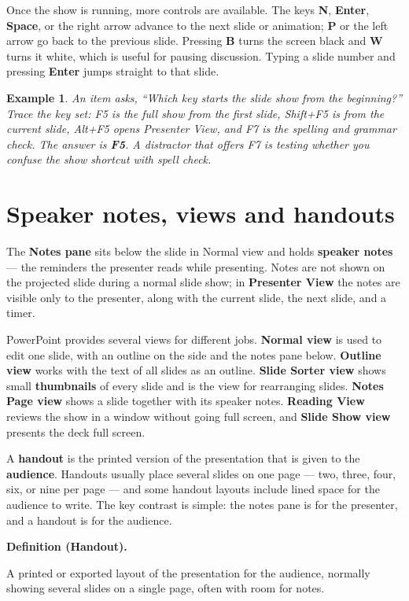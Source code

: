 \documentclass[11pt]{article}
\newtheorem{example}{Example}[section]
\newenvironment{definitionbox}[1]{%
  \par\noindent\textbf{Definition (#1).}\ \itshape
}{\par\vspace{0.3em}}
\begin{document}
Once the show is running, more controls are available. The keys \textbf{N},
\textbf{Enter}, \textbf{Space}, or the right arrow advance to the next slide or
animation; \textbf{P} or the left arrow go back to the previous slide.
Pressing \textbf{B} turns the screen black and \textbf{W} turns it white, which
is useful for pausing discussion. Typing a slide number and pressing
\textbf{Enter} jumps straight to that slide.

\begin{example}
An item asks, ``Which key starts the slide show from the beginning?'' Trace
the key set: F5 is the full show from the first slide, Shift+F5 is from the
current slide, Alt+F5 opens Presenter View, and F7 is the spelling and grammar
check. The answer is \textbf{F5}. A distractor that offers F7 is testing
whether you confuse the show shortcut with spell check.
\end{example}

\section{Speaker notes, views and handouts}
The \textbf{Notes pane} sits below the slide in Normal view and holds
\textbf{speaker notes} --- the reminders the presenter reads while presenting.
Notes are not shown on the projected slide during a normal slide show; in
\textbf{Presenter View} the notes are visible only to the presenter, along with
the current slide, the next slide, and a timer.

PowerPoint provides several views for different jobs. \textbf{Normal view} is
used to edit one slide, with an outline on the side and the notes pane below.
\textbf{Outline view} works with the text of all slides as an outline.
\textbf{Slide Sorter view} shows small \textbf{thumbnails} of every slide and
is the view for rearranging slides. \textbf{Notes Page view} shows a slide
together with its speaker notes. \textbf{Reading View} reviews the show in a
window without going full screen, and \textbf{Slide Show view} presents the
deck full screen.

A \textbf{handout} is the printed version of the presentation that is given to
the \textbf{audience}. Handouts usually place several slides on one page ---
two, three, four, six, or nine per page --- and some handout layouts include
lined space for the audience to write. The key contrast is simple: the notes
pane is for the presenter, and a handout is for the audience.

\begin{definitionbox}{Handout}
A printed or exported layout of the presentation for the audience, normally
showing several slides on a single page, often with room for notes.
\end{definitionbox}
\end{document}
